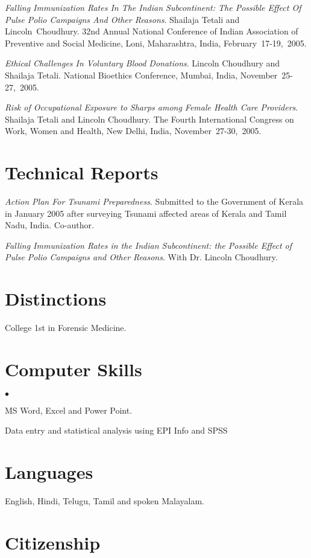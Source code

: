 \documentclass[margin,line]{res}
\newenvironment{list2}{
  \begin{list}{$\bullet$}{%
      \setlength{\itemsep}{0in}
      \setlength{\parsep}{0in} \setlength{\parskip}{0in}
      \setlength{\topsep}{0in} \setlength{\partopsep}{0in} 
      \setlength{\leftmargin}{0.2in}}}{\end{list}}
\begin{document}
\begin{resume}
\emph{Falling Immunization Rates In The Indian Subcontinent: The
  Possible Effect Of Pulse Polio Campaigns And Other Reasons}.
Shailaja Tetali and Lincoln~Choudhury.  32nd Annual National
Conference of Indian Association of Preventive and Social
Medicine, Loni, Maharashtra, India,  February~17-19,~2005.

\emph{Ethical Challenges In Voluntary Blood Donations}.  Lincoln
Choudhury and Shailaja Tetali.  National Bioethics Conference,
Mumbai, India, November~25-27,~2005.

\emph{Risk of Occupational Exposure to Sharps among Female
  Health Care Providers}.  Shailaja Tetali and Lincoln
Choudhury.  The Fourth International Congress on Work, Women and
Health, New Delhi, India,  November~27-30,~2005.


\section{\sc Technical Reports}

\emph{Action Plan For Tsunami Preparedness}. Submitted to the
Government of Kerala in January 2005 after surveying Tsunami
affected areas of Kerala and Tamil Nadu, India.  Co-author.

\emph{Falling Immunization Rates in the Indian Subcontinent: the
  Possible Effect of Pulse Polio Campaigns and Other Reasons}.
With Dr. Lincoln Choudhury.  


\section{\sc Distinctions}
College 1st in Forensic Medicine.

\section{\sc Computer Skills} 
\begin{list2}
\item MS Word, Excel and Power Point.
\item Data entry and statistical analysis using EPI Info and SPSS
\end{list2}

\section{\sc Languages}

English, Hindi, Telugu, Tamil and spoken Malayalam. 

\section{\sc Citizenship}


\end{resume}
\end{document}

